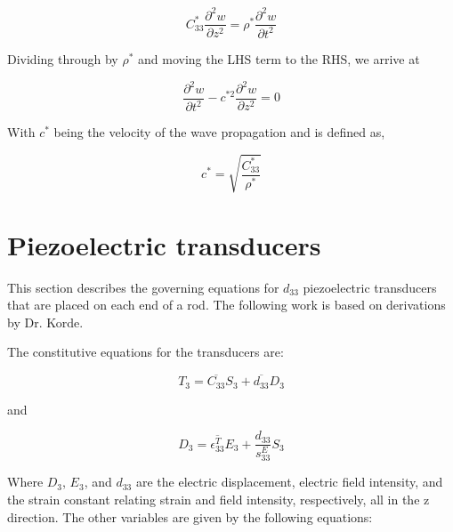 \begin{equation}
C^*_{33}\frac{\partial ^2w}{\partial z^2} = \rho^* \frac{\partial ^2w}{\partial t^2}
\end{equation}

Dividing through by $\rho^*$ and moving the LHS term to the RHS, we arrive at

\begin{equation}
\frac{\partial ^2w}{\partial t^2} - c^{*2} \frac{\partial ^2w}{\partial z^2} = 0
\label{eq:waveEquationFin}
\end{equation}


With $c^*$ being the velocity of the wave propagation and is defined as,

\begin{equation}
c^* = \sqrt{\frac{C^*_{33}}{\rho^*}}
\end{equation}

\section{Piezoelectric transducers}

This section describes the governing equations for $d_{33}$ piezoelectric transducers that are placed on each end of a rod. The following work is based on derivations by Dr. Korde.

The constitutive equations for the transducers are:

\begin{equation}
T_3 = \overline{C_{33}} S_3 + \overline{d_{33}} D_3
\end{equation}

and 

\begin{equation}
D_3 = \overline{\epsilon ^T_{33}} E_3 + \frac{d_{33}}{s^E_{33}} S_3
\end{equation}


Where $D_3$, $E_3$, and $d_{33}$ are the electric displacement, electric field intensity, and the strain constant relating strain and field intensity, respectively, all in the z direction. The other variables are given by the following equations:

